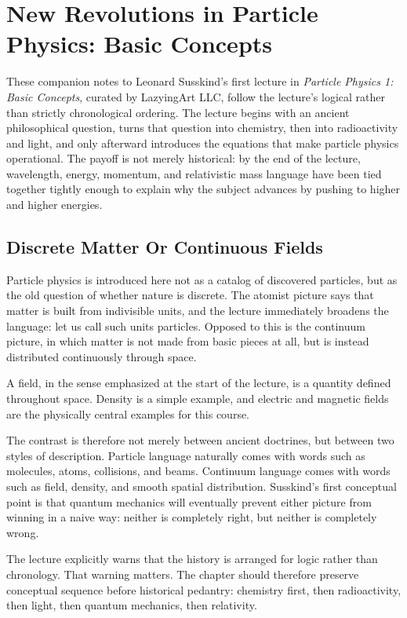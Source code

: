 \chapter{New Revolutions in Particle Physics: Basic Concepts}

These companion notes to Leonard Susskind's first lecture in \emph{Particle Physics 1: Basic Concepts}, curated by LazyingArt LLC, follow the lecture's logical rather than strictly chronological ordering. The lecture begins with an ancient philosophical question, turns that question into chemistry, then into radioactivity and light, and only afterward introduces the equations that make particle physics operational. The payoff is not merely historical: by the end of the lecture, wavelength, energy, momentum, and relativistic mass language have been tied together tightly enough to explain why the subject advances by pushing to higher and higher energies.

\section{Discrete Matter Or Continuous Fields}

Particle physics is introduced here not as a catalog of discovered particles, but as the old question of whether nature is discrete. The atomist picture says that matter is built from indivisible units, and the lecture immediately broadens the language: let us call such units particles. Opposed to this is the continuum picture, in which matter is not made from basic pieces at all, but is instead distributed continuously through space.

\begin{definition}
A field, in the sense emphasized at the start of the lecture, is a quantity defined throughout space. Density is a simple example, and electric and magnetic fields are the physically central examples for this course.
\end{definition}

The contrast is therefore not merely between ancient doctrines, but between two styles of description. Particle language naturally comes with words such as molecules, atoms, collisions, and beams. Continuum language comes with words such as field, density, and smooth spatial distribution. Susskind's first conceptual point is that quantum mechanics will eventually prevent either picture from winning in a naive way: neither is completely right, but neither is completely wrong.

\begin{remark}
The lecture explicitly warns that the history is arranged for logic rather than chronology. That warning matters. The chapter should therefore preserve conceptual sequence before historical pedantry: chemistry first, then radioactivity, then light, then quantum mechanics, then relativity.
\end{remark}

